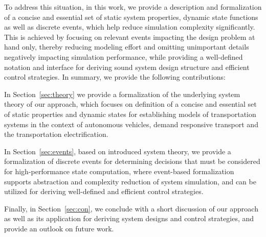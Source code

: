 \documentclass[graybox]{svmult}
\begin{document}

To address this situation, in this work, we provide a description and formalization of a concise and essential set of static system properties, dynamic state functions as well as discrete events, which help reduce simulation complexity significantly. 
This is achieved by focusing on relevant events impacting the design problem at hand only, thereby reducing modeling effort and omitting unimportant details negatively impacting simulation performance, while providing a well-defined notation and interface for deriving sound system design structure and efficient control strategies. In summary, we provide the following contributions:

In Section~\ref{sec:theory} we provide a formalization of the underlying system theory of our approach, which focuses on definition of a concise and essential set of static properties and dynamic states for establishing models of transportation systems in the context of autonomous vehicles, demand responsive transport and the transportation electrification.

In Section~\ref{sec:events}, based on introduced system theory, we provide a formalization of discrete events for determining decisions that must be considered for high-performance state computation, where event-based formalization supports abstraction and complexity reduction of system simulation, and can be utilized for deriving well-defined and efficient control strategies. 

Finally, in Section~\ref{sec:con}, we conclude with a short discussion of our approach as well as its application for deriving system designs and control strategies, and provide an outlook on future work.
\vspace{-2mm}
\end{document}
